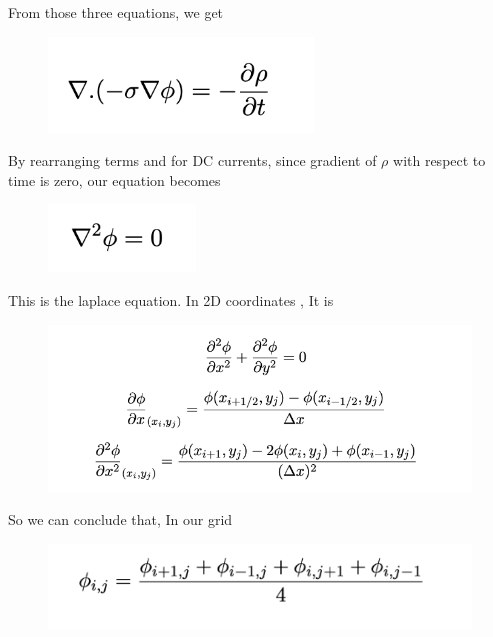 \documentclass[12pt, a4paper]{report}
\begin{document}
 From those three equations, we get 
 \begin{figure}[!tbh]
   	\centering
   	\includegraphics[scale=0.85]{B.png}
 \end{figure} 
 
 By rearranging terms and for DC currents, since gradient of $\rho$ with respect to time is zero, our equation becomes
  \begin{figure}[!tbh]
   	\centering
   	\includegraphics[scale=0.85]{D.png}
 \end{figure} 
   
This is the laplace equation. In 2D coordinates , It is 
  \begin{figure}[!tbh]
   	\centering
   	\includegraphics[scale=0.85]{E.png}
 \end{figure} 
\newpage
So we can conclude that, In our grid
  \begin{figure}[!tbh]
   	\centering
   	\includegraphics[scale=0.85]{F.png}
 \end{figure} 
   
\end{document}
